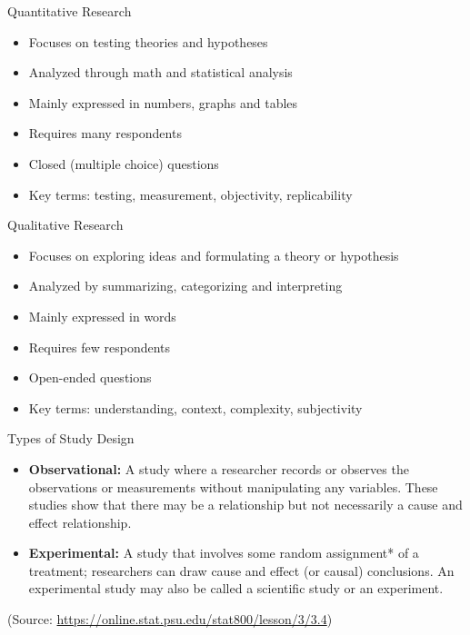 \begin{frame}[t]{Quantitative Research}
	\begin{itemize}
		\item Focuses on testing theories and hypotheses	
		\item Analyzed through math and statistical analysis	
		\item Mainly expressed in numbers, graphs and tables
		\item Requires many respondents	
		\item Closed (multiple choice) questions	
		\item Key terms: testing, measurement, objectivity, replicability
	\end{itemize}
\end{frame}



\begin{frame}[t]{Qualitative Research}
	\begin{itemize}
		\item Focuses on exploring ideas and formulating a theory or hypothesis
		\item Analyzed by summarizing, categorizing and interpreting
		\item Mainly expressed in words
		\item Requires few respondents
		\item Open-ended questions
		\item Key terms: understanding, context, complexity, subjectivity
	\end{itemize}
\end{frame}

\begin{frame}[t]{Types of Study Design}
	\begin{itemize}
		\item \textbf{Observational:} A study where a researcher records or 
		observes the observations or measurements without manipulating any 
		variables. These studies show that there may be a relationship but not 
		necessarily a cause and effect relationship. 
		\item \textbf{Experimental:} A study that involves some random 
		assignment* of a treatment; researchers can draw cause and effect (or 
		causal) conclusions. An experimental study may also be called a 
		scientific study or an experiment.
	\end{itemize}
\centering 
(Source: \url{https://online.stat.psu.edu/stat800/lesson/3/3.4})
\end{frame}

